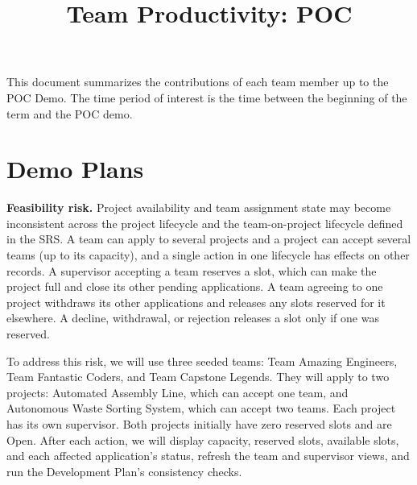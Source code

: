 \documentclass{article}
\title{Team Productivity: POC\\\projname}
\author{\authname}
\date{}
\begin{document}
\maketitle

This document summarizes the contributions of each team member up to the POC
Demo.  The time period of interest is the time between the beginning of the term
and the POC demo.




\section{Demo Plans}



\textbf{Feasibility risk.}
Project availability and team assignment state may become inconsistent
across the project lifecycle and the team-on-project lifecycle defined
in the SRS. A team can apply to several projects and a project can
accept several teams (up to its capacity), and a single action in one
lifecycle has effects on other records. A supervisor accepting a team
reserves a slot, which can make the project full and close its other
pending applications. A team agreeing to one project withdraws its other
applications and releases any slots reserved for it elsewhere. A
decline, withdrawal, or rejection releases a slot only if one was
reserved.

To address this risk, we will use three seeded teams: Team Amazing Engineers, Team Fantastic Coders, and Team Capstone Legends. They will apply to two projects: Automated Assembly Line, which can accept one team, and Autonomous Waste Sorting System, which can accept two teams. Each project has its own supervisor. Both projects initially have zero reserved slots and are Open. After each action, we will display capacity, reserved slots, available slots, and each affected application's status, refresh the team and supervisor views, and run the Development Plan's consistency checks.
\end{document}
